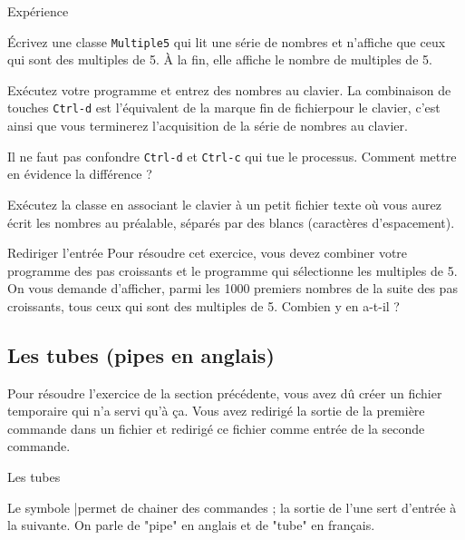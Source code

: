 \documentclass[a4paper,11pt]{article}
\begin{document}
		\begin{Tutoriel}{Exp\'erience} 
				\begin{steps}
					\item Écrivez une classe \verb_Multiple5_ qui lit une série de nombres et n'affiche que ceux qui sont des multiples de 5. 
					À la fin, elle affiche le nombre de multiples de 5.
			
					\item Exécutez votre programme et entrez des nombres au clavier.
						La combinaison de touches \verb_Ctrl-d_ est l'\'equivalent de la marque \guillemotleft fin de fichier\guillemotright  pour le clavier,
						c'est ainsi que vous terminerez l'acquisition de la s\'erie de nombres au clavier.
					
					\item Il ne faut pas confondre \verb_Ctrl-d_ et \verb_Ctrl-c_
						qui tue le processus. Comment mettre en \'evidence la diff\'erence ?
					
					\item Ex\'ecutez la classe en associant le clavier 
						\`a un petit fichier texte o\`u vous aurez \'ecrit les nombres au pr\'ealable,
						s\'epar\'es par des blancs (caractères d'espacement).						
					
				\end{steps}
		\end{Tutoriel}
				
			
		\begin{Exercice}{Rediriger l'entrée} 
			Pour r\'esoudre cet exercice, vous devez combiner votre programme des pas croissants
			et le programme qui s\'electionne les multiples de 5. On vous demande d'afficher,
			parmi les 1000 premiers nombres de la suite des pas croissants, tous ceux qui sont des multiples de 5.
			Combien y en a-t-il ?
		\end{Exercice}
            		
        \subsection{Les tubes (pipes en anglais)}
Pour r\'esoudre l'exercice de la section pr\'ec\'edente, vous avez d\^u cr\'eer un fichier
temporaire qui n'a servi qu'\`a \c ca. Vous avez redirig\'e la sortie de la premi\`ere commande dans un fichier et
redirig\'e ce fichier comme entr\'ee de la seconde commande.
					
			\begin{coltbox}{Les tubes}
		
				Le symbole \guillemotleft |\guillemotright  permet de chainer des commandes ; la sortie de l'une sert d'entr\'ee \`a la suivante. 
				On parle de "pipe" en anglais et de "tube" en fran\c cais.
					
			\end{coltbox}
\end{document}
